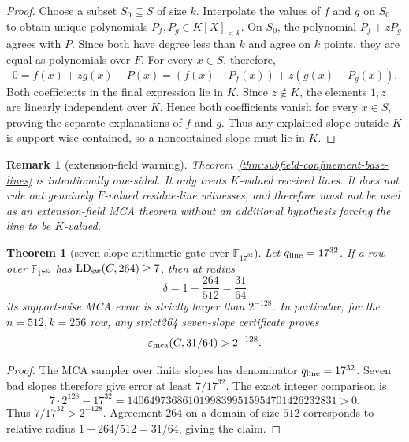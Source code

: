 \documentclass[11pt]{article}
\newtheorem{theorem}{Theorem}
\newtheorem{remark}{Remark}
\newcommand{\F}{\mathbb F}
\newcommand{\qline}{q_{\rm line}}
\begin{document}
\begin{proof}
Choose a subset \(S_0\subseteq S\) of size \(k\).  Interpolate the values of
\(f\) and \(g\) on \(S_0\) to obtain unique polynomials
\(P_f,P_g\in K[X]_{<k}\).  On \(S_0\), the polynomial
\(P_f+zP_g\) agrees with \(P\).  Since both have degree less than \(k\) and agree
on \(k\) points, they are equal as polynomials over \(F\).  For every
\(x\in S\), therefore,
\[
  0=f(x)+zg(x)-P(x)
   =(f(x)-P_f(x))+z(g(x)-P_g(x)).
\]
Both coefficients in the final expression lie in \(K\).  Since
\(z\notin K\), the elements \(1,z\) are linearly independent over \(K\).  Hence
both coefficients vanish for every \(x\in S\), proving the separate explanations
of \(f\) and \(g\).  Thus any explained slope outside \(K\) is support-wise
contained, so a noncontained slope must lie in \(K\).
\end{proof}

\begin{remark}[extension-field warning]
Theorem~\ref{thm:subfield-confinement-base-lines} is intentionally one-sided.
It only treats \(K\)-valued received lines.  It does not rule out genuinely
\(F\)-valued residue-line witnesses, and therefore must not be used as an
extension-field MCA theorem without an additional hypothesis forcing the line to
be \(K\)-valued.
\end{remark}

\begin{theorem}[seven-slope arithmetic gate over \(\F_{17^{32}}\)]
\label{thm:seven-slope-arithmetic-gate}
Let \(\qline=17^{32}\).  If a row over \(\F_{17^{32}}\) has
\(\operatorname{LD}_{\rm sw}(C,264)\ge7\), then at radius
\[
  \delta=1-\frac{264}{512}=\frac{31}{64}
\]
its support-wise MCA error is strictly larger than \(2^{-128}\).  In particular,
for the \(n=512,k=256\) row, any strict264 seven-slope certificate proves
\[
  \varepsilon_{\rm mca}(C,31/64)>2^{-128}.
\]
\end{theorem}

\begin{proof}
The MCA sampler over finite slopes has denominator \(\qline=17^{32}\).  Seven
bad slopes therefore give error at least \(7/17^{32}\).  The exact integer
comparison is
\[
  7\cdot 2^{128}-17^{32}
  =14064973686101998399515954701426232831>0.
\]
Thus \(7/17^{32}>2^{-128}\).  Agreement \(264\) on a domain of size \(512\)
corresponds to relative radius \(1-264/512=31/64\), giving the claim.
\end{proof}
\end{document}
